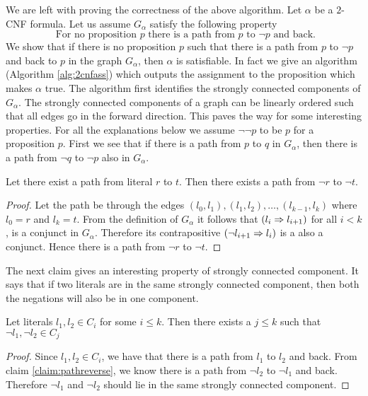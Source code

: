 We are left with proving the correctness of the above algorithm. Let $\alpha$ be a $2$-CNF formula. Let us assume $G_{\alpha}$ satisfy the following property
\begin{equation}
\label{eq:2cnfsatprop}
\text{ For no proposition } p \text{ there is a path from } p \text{ to } \neg p \text{ and back.}
\end{equation}
We show that if there is no proposition $p$ such that there is a path from $p$ to $\neg p$ and back to $p$ in the graph $G_{\alpha}$, then $\alpha$ is satisfiable. In fact we give an algorithm (Algorithm \ref{alg:2cnfass}) which outputs the assignment to the proposition which makes $\alpha$ true. The algorithm first identifies the strongly connected components of $G_{\alpha}$. The strongly connected components of a graph can be linearly ordered such that all edges go in the forward direction. This paves the way for some interesting properties. For all the explanations below we assume $\neg \neg p$ to be $p$ for a proposition $p$. First we see that if there is a path from $p$ to $q$ in $G_{\alpha}$, then there is a path from $\neg q$ to $\neg p$ also in $G_{\alpha}$.
\begin{claim}
\label{claim:pathreverse}
Let there exist a path from literal $r$ to $t$. Then there exists a path from $\neg r$ to $\neg t$.
\end{claim}
\begin{proof}
Let the path be through the edges $(l_0,l_1),(l_1,l_2),\dots,(l_{k-1},l_k)$ where $l_0=r$ and $l_k=t$. From the definition of $G_{\alpha}$ it follows that $(l_i \Rightarrow l_{i+1})$ for all $i < k$, is a conjunct in $G_{\alpha}$. Therefore its contrapositive $(\neg l_{i+1} \Rightarrow l_i)$ is a also a conjunct. Hence there is a path from $\neg r$ to $\neg t$.
\end{proof}

The next claim gives an interesting property of strongly connected component. It says that if two literals are in the same strongly connected component, then both the negations will also be in one component.
\begin{claim}
\label{claim:strongcomponent}
Let literals $l_1,l_2 \in C_i$ for some $i \leq k$. Then there exists a $j \leq k$ such that $\neg l_1,\neg l_2 \in C_j$
\end{claim}
\begin{proof}
Since $l_1,l_2 \in C_i$, we have that there is a path from $l_1$ to $l_2$ and back. From claim \ref{claim:pathreverse}, we know there is a path from $\neg l_2$ to $\neg l_1$ and back. Therefore $\neg l_1$ and $\neg l_2$ should lie in the same strongly connected component.
\end{proof}

